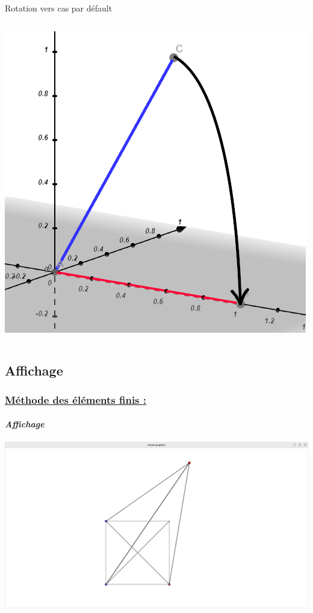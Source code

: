\documentclass[10pt]{beamer}
\begin{document}
\begin{frame}
\begin{block}{Rotation vers cas par d\'efault}
\begin{columns}[t]
\begin{column}{5cm}
 				 	\includegraphics[scale=0.2]{Images/CasFinal.png}
				 \end{column}
 			\end{columns}
		\end{block}
	\end{frame}
	\subsection{Affichage}
	\begin{frame}
		\frametitle{\uline{M\'ethode des \'el\'ements finis :}}
		\framesubtitle{\textit{Affichage}}
		\includegraphics[scale = 0.17]{Images/Copium.png}
	\end{frame} 
\end{document}
